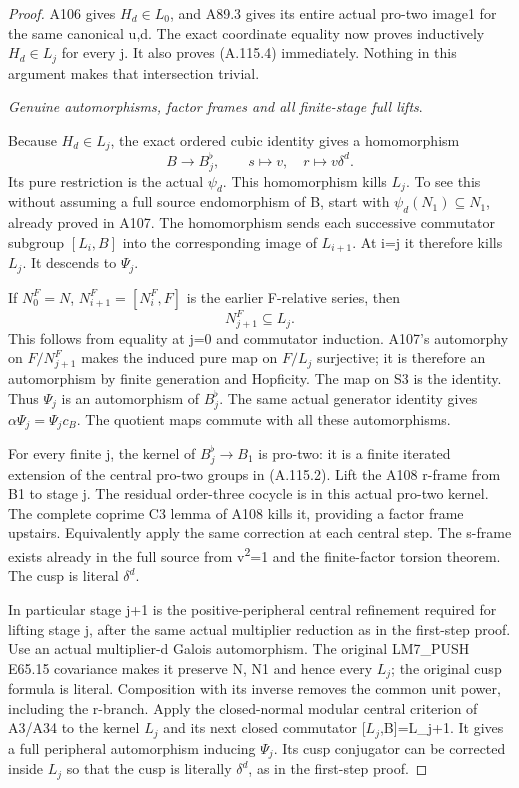 \begin{proof}
A106 gives \(H_d\in L_0\), and A89.3 gives its entire actual pro-two image1 for the same canonical u,d. The exact coordinate equality now proves inductively \(H_d\in L_j\) for every j. It also proves (A.115.4) immediately. Nothing in this argument makes that intersection trivial.

\medskip\noindent\emph{Genuine automorphisms, factor frames and all finite-stage full lifts}.

Because \(H_d\in L_j\), the exact ordered cubic identity gives a homomorphism
\[
B\to B_j^\flat,\qquad s\mapsto v,\quad r\mapsto v\delta^d.
\]
Its pure restriction is the actual \(\psi_d\). This homomorphism kills \(L_j\). To see this without assuming a full source endomorphism of B, start with \(\psi_d(N_1)\subseteq N_1\), already proved in A107. The homomorphism sends each successive commutator subgroup \([L_i,B]\) into the corresponding image of \(L_{i+1}\). At i=j it therefore kills \(L_j\). It descends to \(\Psi_j\).

If \(N^{F}_0=N\), \(N^{F}_{i+1}=[N^{F}_i,F]\) is the earlier F-relative series, then
\[
N^{F}_{j+1}\subseteq L_j.
\]
This follows from equality at j=0 and commutator induction. A107's automorphy on \(F/N^{F}_{j+1}\) makes the induced pure map on \(F/L_j\) surjective; it is therefore an automorphism by finite generation and Hopficity. The map on S3 is the identity. Thus \(\Psi_j\) is an automorphism of \(B_j^\flat\). The same actual generator identity gives \(\alpha\Psi_j=\Psi_jc_B\). The quotient maps commute with all these automorphisms.

For every finite j, the kernel of \(B_j^\flat\to B_1\) is pro-two: it is a finite iterated extension of the central pro-two groups in (A.115.2). Lift the A108 r-frame from B1 to stage j. The residual order-three cocycle is in this actual pro-two kernel. The complete coprime C3 lemma of A108 kills it, providing a factor frame upstairs. Equivalently apply the same correction at each central step. The s-frame exists already in the full source from v\textsuperscript{2}=1 and the finite-factor torsion theorem. The cusp is literal \(\delta^d\).

In particular stage j+1 is the positive-peripheral central refinement required for lifting stage j, after the same actual multiplier reduction as in the first-step proof. Use an actual multiplier-d Galois automorphism. The original LM7\_PUSH E65.15 covariance makes it preserve N, N1 and hence every \(L_j\); the original cusp formula is literal. Composition with its inverse removes the common unit power, including the r-branch. Apply the closed-normal modular central criterion of A3/A34 to the kernel \(L_j\) and its next closed commutator [\(L_j\),B]=L_{j+1}. It gives a full peripheral automorphism inducing \(\Psi_j\). Its cusp conjugator can be corrected inside \(L_j\) so that the cusp is literally \(\delta^d\), as in the first-step proof.


\end{proof}
